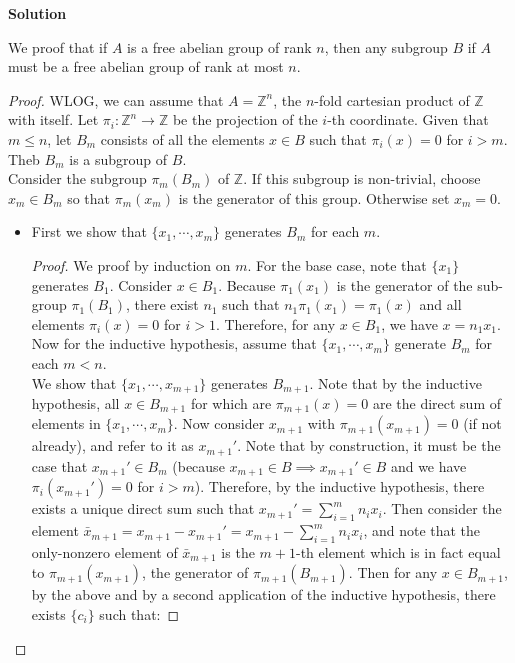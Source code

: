 \documentclass[12pt]{article}
\newcounter{AnswerCounter}
\newcounter{SubAnswerCounter}
\newenvironment{answer}[0]{
  \setcounter{SubAnswerCounter}{1}
  \bigskip
  \textbf{Solution \arabic{AnswerCounter}}
  \\
  \begin{small}
}{
  \end{small}
  \stepcounter{AnswerCounter}
}
\begin{document}
\begin{answer}[Page 412, \#6]
We proof that if $A$ is a free abelian group of rank $n$, then any subgroup $B$ if $A$ must be a free abelian group of rank at most $n$.
\begin{proof}
WLOG, we can assume that $A = \mathbb{Z}^n$, the $n$-fold cartesian product of $\mathbb{Z}$ with itself. Let $\pi_i : \mathbb{Z}^n \to \mathbb{Z}$ be the projection of the $i$-th coordinate. Given that $m \leq n$, let $B_m$ consists of all the elements $x \in B$ such that $\pi_i(x) = 0$ for $i > m$. Theb $B_m$ is a subgroup of $B$.\\
Consider the subgroup $\pi_m(B_m)$ of $\mathbb{Z}$. If this subgroup is non-trivial, choose $x_m \in B_m$ so that $\pi_m(x_m)$ is the generator of this group. Otherwise set $x_m = 0$.\\
\begin{itemize}
\item First we show that $\{x_1, \cdots, x_m\}$ generates $B_m$ for each $m$.
\begin{proof}
We proof by induction on $m$. For the base case, note that $\{x_1\}$ generates $B_1$.  Consider $x \in B_1$. Because $\pi_1(x_1)$ is the generator of the sub-group $\pi_1(B_1)$, there exist $n_1$ such that $n_1\pi_1(x_1) = \pi_1(x)$ and all elements $\pi_i(x) = 0$ for $i > 1$. Therefore, for any $x \in B_1$, we have $x = n_1 x_1$. \\
Now for the inductive hypothesis, assume that $\{x_1, \cdots, x_m\}$ generate $B_m$ for each $m < n$. \\
We show that $\{x_1, \cdots, x_{m+1}\}$ generates $B_{m+1}$. Note that by the inductive hypothesis, all $x \in B_{m+1}$ for which are $\pi_{m+1}(x) = 0$ are the direct sum of elements in $\{x_1, \cdots, x_{m}\}$. Now consider $x_{m+1}$ with $\pi_{m+1}(x_{m+1}) = 0$ (if not already), and refer to it as $x_{m+1}'$. Note that by construction, it must be the case that $x_{m+1}' \in B_{m}$ (because $x_{m+1} \in B \implies x_{m+1}' \in B$ and we have $\pi_i(x_{m+1}') = 0$ for $i > m$). Therefore, by the inductive hypothesis, there exists a unique direct sum such that $x_{m+1}' = \sum_{i=1}^m n_i x_{i}$. Then consider the element $\bar{x}_{m+1} = x_{m+1} - x_{m+1}' = x_{m+1} - \sum_{i=1}^m n_i x_{i}$, and note that the only-nonzero element of $\bar{x}_{m+1}$ is the $m+1$-th element which is in fact equal to $\pi_{m+1}(x_{m+1})$, the generator of $\pi_{m+1}(B_{m+1})$. Then for any $x \in B_{m+1}$, by the above and by a second application of the inductive hypothesis, there exists $\{c_i\}$ such that:

\end{proof}
\end{itemize}
\end{proof}
\end{answer}
\end{document}
